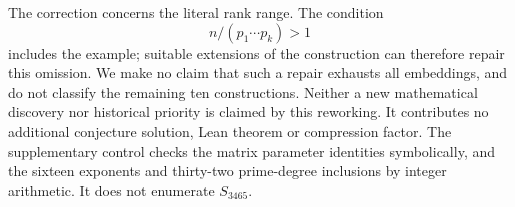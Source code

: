 \documentclass[11pt,a4paper]{article}
\begin{document}
The correction concerns the literal rank range. The condition
\[
                         n/(p_1\cdots p_k)>1
\]
includes the example; suitable extensions
of the construction can therefore repair this omission. We make no
claim that such a repair exhausts all embeddings, and do not classify
the remaining ten constructions. Neither a new mathematical discovery
nor historical priority is claimed by this reworking. It contributes
no additional conjecture solution, Lean theorem or compression factor.
The supplementary control checks the matrix parameter identities
symbolically, and the sixteen exponents and thirty-two prime-degree
inclusions by integer arithmetic. It does not enumerate $S_{3465}$.
\end{document}
